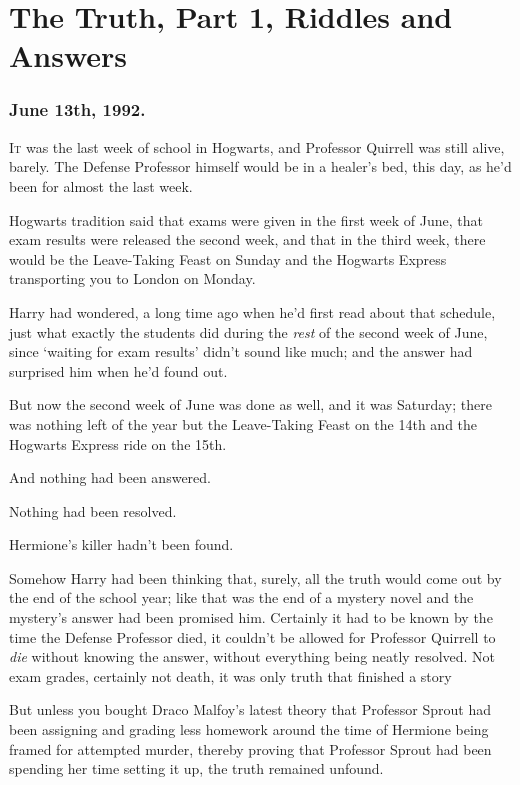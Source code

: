 \chapter{The Truth, Part 1, Riddles and Answers}

\subsection{June 13th, 1992.}

\lettrine{I}{t} was the last week of school in Hogwarts, and Professor Quirrell was still
alive, barely. The Defense Professor himself would be in a healer's bed, this
day, as he'd been for almost the last week.

Hogwarts tradition said that exams were given in the first week of June, that
exam results were released the second week, and that in the third week, there
would be the Leave-Taking Feast on Sunday and the Hogwarts Express transporting
you to London on Monday.

Harry had wondered, a long time ago when he'd first read about that schedule,
just what exactly the students did during the \emph{rest} of the second week of
June, since `waiting for exam results' didn't sound like much; and the answer
had surprised him when he'd found out.

But now the second week of June was done as well, and it was Saturday; there
was nothing left of the year but the Leave-Taking Feast on the 14th and the
Hogwarts Express ride on the 15th.

And nothing had been answered.

Nothing had been resolved.

Hermione's killer hadn't been found.

Somehow Harry had been thinking that, surely, all the truth would come out by
the end of the school year; like that was the end of a mystery novel and the
mystery's answer had been promised him. Certainly it had to be known by the
time the Defense Professor{\el} died, it couldn't be allowed for Professor
Quirrell to \emph{die} without knowing the answer, without everything being
neatly resolved. Not exam grades, certainly not death, it was only truth that
finished a story{\el}

But unless you bought Draco Malfoy's latest theory that Professor Sprout had
been assigning and grading less homework around the time of Hermione being
framed for attempted murder, thereby proving that Professor Sprout had been
spending her time setting it up, the truth remained unfound.

